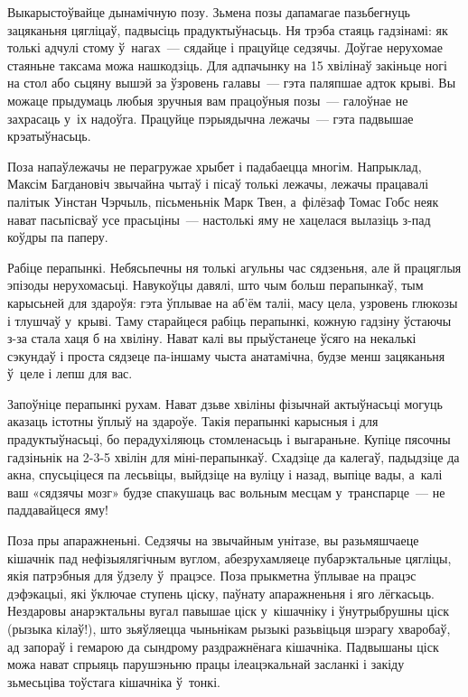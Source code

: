 Выкарыстоўвайце дынамічную позу. Зьмена позы дапамагае пазьбегнуць зацяканьня цягліцаў, падвысіць прадуктыўнасьць. Ня трэба стаяць гадзінамі: як толькі адчулі стому ў~нагах~--- сядайце і працуйце седзячы. Доўгае нерухомае стаяньне таксама можа нашкодзіць. Для адпачынку на 15 хвілінаў закіньце ногі на стол або сьцяну вышэй за ўзровень галавы~--- гэта паляпшае адток крыві. Вы можаце прыдумаць любыя зручныя вам працоўныя позы~--- галоўнае не захрасаць у~іх надоўга. Працуйце пэрыядычна лежачы~--- гэта падвышае крэатыўнасьць.

Поза напаўлежачы не перагружае хрыбет і падабаецца многім. Напрыклад, Максім Багдановіч звычайна чытаў і пісаў толькі лежачы, лежачы працавалі палітык Уінстан Чэрчыль, пісьменьнік Марк Твен, а~філёзаф Томас Гобс неяк нават пасьпісваў усе прасьціны~--- настолькі яму не хацелася вылазіць з-пад коўдры па паперу.

Рабіце перапынкі. Небясьпечны ня толькі агульны час сядзеньня, але й працяглыя эпізоды нерухомасьці. Навукоўцы давялі, што чым больш перапынкаў, тым карысьней для здароўя: гэта ўплывае на аб'ём таліі, масу цела, узровень глюкозы і тлушчаў у~крыві. Таму старайцеся рабіць перапынкі, кожную гадзіну ўстаючы з-за стала хаця б на хвіліну. Нават калі вы прыўстанеце ўсяго на некалькі сэкундаў і проста сядзеце па-іншаму чыста анатамічна, будзе менш зацяканьня ў~целе і лепш для вас.

Запоўніце перапынкі рухам. Нават дзьве хвіліны фізычнай актыўнасьці могуць аказаць істотны ўплыў на здароўе. Такія перапынкі карысныя і для прадуктыўнасьці, бо перадухіляюць стомленасьць і выгараньне. Купіце пясочны гадзіньнік на 2-3-5 хвілін для міні-перапынкаў. Схадзіце да калегаў, падыдзіце да акна, спусьціцеся па лесьвіцы, выйдзіце на вуліцу і назад, выпіце вады, а~калі ваш «сядзячы мозг» будзе спакушаць вас вольным месцам у~транспарце~--- не паддавайцеся яму!

Поза пры апаражненьні. Седзячы на звычайным унітазе, вы разьмяшчаеце кішачнік пад нефізыялягічным вуглом, абезрухамляеце пубарэктальные цягліцы, якія патрэбныя для ўдзелу ў~працэсе. Поза прыкметна ўплывае на працэс дэфэкацыі, які ўключае ступень ціску, паўнату апаражненьня і яго лёгкасьць. Нездаровы анарэктальны вугал павышае ціск у~кішачніку і ўнутрыбрушны ціск (рызыка кілаў!), што зьяўляецца чыньнікам рызыкі разьвіцьця шэрагу хваробаў, ад запораў і гемарою да сындрому раздражнёнага кішачніка. Падвышаны ціск можа нават спрыяць парушэньню працы ілеацэкальнай засланкі і закіду зьмесьціва тоўстага кішачніка ў~тонкі.

